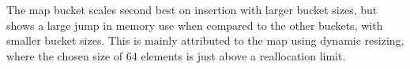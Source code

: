 The {\keyword map} bucket scales second best on insertion with larger bucket
sizes, but shows a large jump in memory use when compared to the other buckets,
with smaller bucket sizes. This is mainly attributed to the {\keyword map}
using dynamic resizing, where the chosen size of 64 elements is just above a
reallocation limit.

\begin{landscape}
    \begin{figure}[H]
\end{figure}
\end{landscape}
